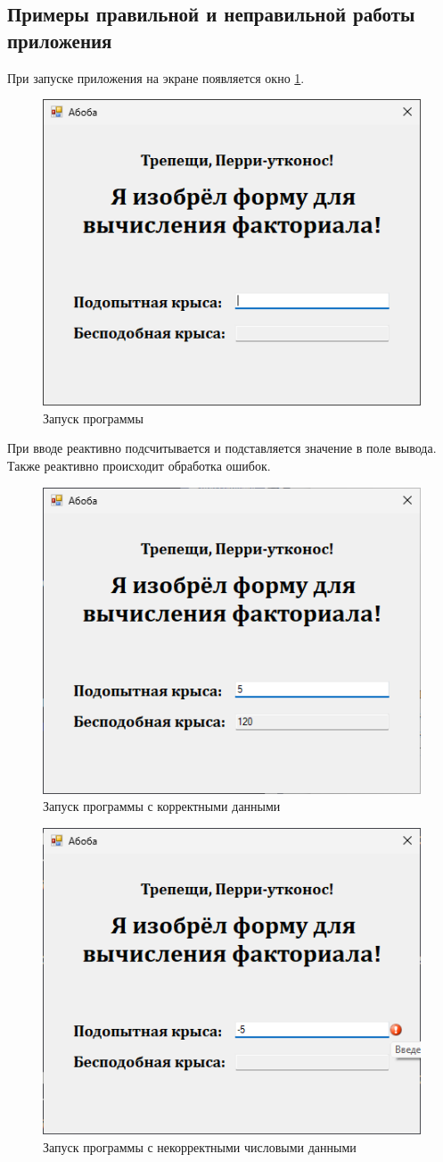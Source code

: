 \subsection{Примеры правильной и неправильной работы приложения}
При запуске приложения на экране появляется окно \ref{fig:factorial-start}.
\begin{figure}
  \centering
  \includegraphics[width=0.5\linewidth]{images/factorial/start.png}
  \caption{Запуск программы}
  \label{fig:factorial-start}
\end{figure}

При вводе реактивно подсчитывается и подставляется значение в поле вывода. Также реактивно происходит обработка ошибок.

\begin{figure}
  \centering
  \includegraphics[width=0.5\linewidth]{images/factorial/okay.png}
  \caption{Запуск программы с корректными данными}
  \label{fig:factorial-okay}
\end{figure}

\begin{figure}
  \centering
  \includegraphics[width=0.5\linewidth]{images/factorial/error.png}
  \caption{Запуск программы с некорректными числовыми данными}
  \label{fig:factorial-error}
\end{figure}

